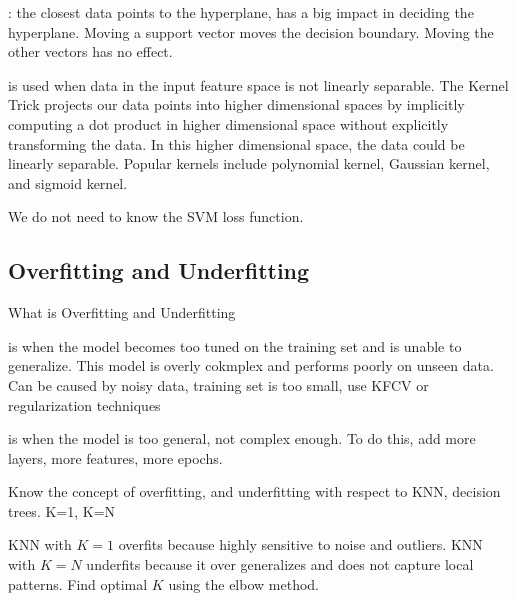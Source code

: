 \documentclass[12pt]{scrartcl}
\begin{document}
\begin{definition}
  : the closest data points to the hyperplane, has a big impact 
  in deciding the hyperplane. Moving a support vector moves the decision boundary. 
  Moving the other vectors has no effect.
\end{definition}

\begin{definition}
   is used when data in the input feature space is not linearly separable. The Kernel Trick projects 
  our data points into higher dimensional spaces by implicitly computing a dot product in higher dimensional space 
  without explicitly transforming the data. In this higher dimensional space, the data could be linearly separable.
  Popular kernels include polynomial kernel, Gaussian kernel, and sigmoid kernel.
\end{definition}

\begin{note}
  We do not need to know the SVM loss function.
\end{note}

\subsection{Overfitting and Underfitting}

What is Overfitting and Underfitting

\begin{definition}
   is when the model becomes too tuned on the training set 
  and is unable to generalize. This model is overly cokmplex and performs poorly on unseen data. Can 
  be caused by noisy data, training set is too small, use KFCV or regularization techniques
\end{definition}

\begin{definition}
   is when the model is too general, not complex enough. To do this, add 
  more layers, more features, more epochs. 
\end{definition}

Know the concept of overfitting, and underfitting with respect to KNN, decision trees.
K=1, K=N 

\begin{example}
  KNN with $K =1$ overfits because highly sensitive to noise and outliers. KNN with 
  $K = N$ underfits because it over generalizes and does not capture local patterns.
  Find optimal $K$ using the elbow method.
\end{example}
\end{document}
